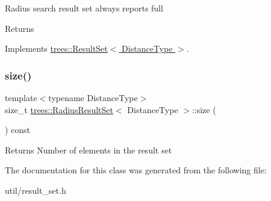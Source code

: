 Radius search result set always reports full \begin{DoxyReturn}{Returns}

\end{DoxyReturn}


Implements \hyperlink{classtrees_1_1_result_set}{trees\+::\+Result\+Set$<$ Distance\+Type $>$}.

\mbox{\label{classtrees_1_1_radius_result_set_a4ac769fcfb64d84d46d0eb233d4681da}} 
\subsubsection{\texorpdfstring{size()}{size()}}
{\footnotesize\ttfamily template$<$typename Distance\+Type$>$ \\
size\+\_\+t \hyperlink{classtrees_1_1_radius_result_set}{trees\+::\+Radius\+Result\+Set}$<$ Distance\+Type $>$\+::size (\begin{DoxyParamCaption}{ }\end{DoxyParamCaption}) const\hspace{0.3cm}{\ttfamily [inline]}}

\begin{DoxyReturn}{Returns}
Number of elements in the result set 
\end{DoxyReturn}


The documentation for this class was generated from the following file\+:\begin{DoxyCompactItemize}
\item 
util/result\+\_\+set.\+h\end{DoxyCompactItemize}
